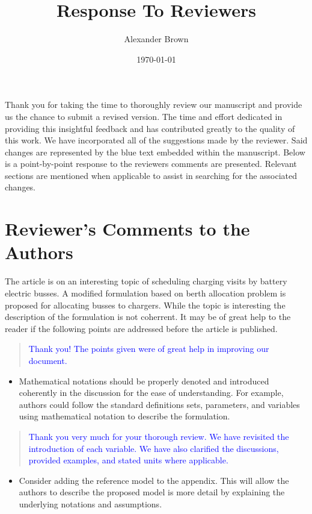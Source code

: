 \documentclass[11pt,a4paper,final]{article}
\author{Alexander Brown}
\date{\today}
\title{Response To Reviewers}
\begin{document}
\maketitle
Thank you for taking the time to thoroughly review our manuscript and provide us the chance to submit a revised version.
The time and effort dedicated in providing this insightful feedback and has contributed greatly to the quality of this
work. We have incorporated all of the suggestions made by the reviewer. Said changes are represented by the blue text
embedded within the manuscript. Below is a point-by-point response to the reviewers comments are presented. Relevant
sections are mentioned when applicable to assist in searching for the associated changes.

\section{Reviewer's Comments to the Authors}
\label{sec:org1cf778f}

The article is on an interesting topic of scheduling charging visits by battery electric busses. A modified formulation
based on berth allocation problem is proposed for allocating busses to chargers. While the topic is interesting the
description of the formulation is not coherrent. It may be of great help to the reader if the following points are
addressed before the article is published.

\begin{quote}
  \textcolor{blue}{Thank you! The points given were of great help in improving our document.}
\end{quote}

\begin{itemize}
\item Mathematical notations should be properly denoted and introduced coherently in the discussion for the ease of understanding. For example, authors could follow the standard definitions sets, parameters, and variables using mathematical notation to describe the formulation.
\end{itemize}

\begin{quote}
  \textcolor{blue}{Thank you very much for your thorough review. We have revisited the introduction of each variable. We have also clarified the discussions, provided examples, and stated units where applicable.}
\end{quote}

\begin{itemize}
\item Consider adding the reference model to the appendix. This will allow the authors to describe the proposed model is more detail by explaining the underlying notations and assumptions.
\end{itemize}
\end{document}

